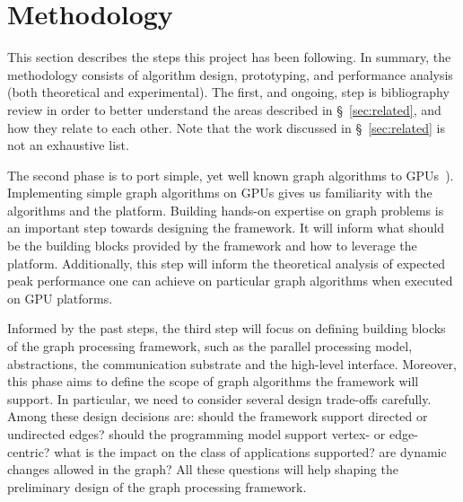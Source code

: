 \section{Methodology}
\label{sec:methodology}
This section describes the steps this project has been following. In summary, the methodology consists of algorithm design, prototyping, and performance analysis (both theoretical and experimental).
The first, and ongoing, step is bibliography review in order to better understand the areas described in \S~\ref{sec:related}, and how they relate to each other. Note that the work discussed in \S~\ref{sec:related} is not an exhaustive list. 

The second phase is to port simple, yet well known graph algorithms to GPUs~\cite{Quinn1984,Meyer2003,Harish2007,Malewicz2009,Sungpack2010}). Implementing simple graph algorithms on GPUs gives us familiarity with the algorithms and the platform. Building hands-on expertise on graph problems is an important step towards designing the framework. It will inform what should be the building blocks provided by the framework and how to leverage the platform. Additionally, this step will inform the theoretical analysis of expected peak performance one can achieve on particular graph algorithms when executed on GPU platforms.

Informed by the past steps, the third step will focus on defining building blocks of the graph processing framework, such as the parallel processing model, abstractions, the communication substrate and the high-level interface. Moreover, this phase aims to define the scope of graph algorithms the framework will support. In particular, we need to consider several design trade-offs carefully. Among these design decisions are: should the framework support directed or undirected edges? should the programming model support vertex- or edge-centric? what is the impact on the class of applications supported? are dynamic changes allowed in the graph? All these questions will help shaping the preliminary design of the graph processing framework.



